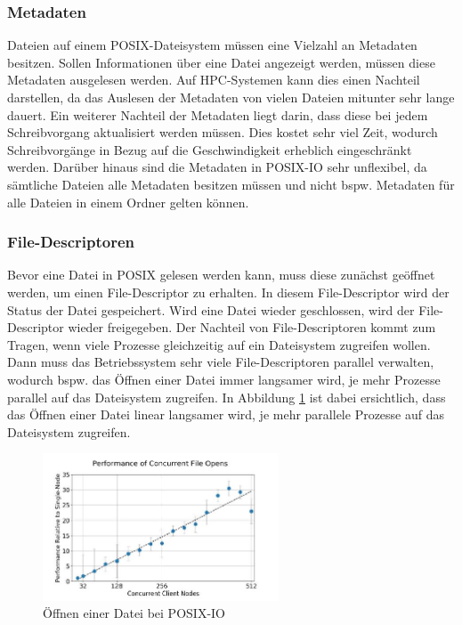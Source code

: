 \subsubsection{Metadaten}
Dateien auf einem POSIX-Dateisystem m\"ussen eine Vielzahl an Metadaten besitzen. Sollen Informationen \"uber eine Datei angezeigt werden, m\"ussen diese Metadaten ausgelesen werden. Auf HPC-Systemen kann dies einen Nachteil darstellen, da das Auslesen der Metadaten von vielen Dateien mitunter sehr lange dauert\cite{Layton.02.03.2010}.\newline
Ein weiterer Nachteil der Metadaten liegt darin, dass diese bei jedem Schreibvorgang aktualisiert werden m\"ussen. Dies kostet sehr viel Zeit, wodurch Schreibvorg\"ange in Bezug auf die Geschwindigkeit erheblich eingeschr\"ankt werden.\newline
Dar\"uber hinaus sind die Metadaten in POSIX-IO sehr unflexibel, da s\"amtliche Dateien alle Metadaten besitzen m\"ussen und nicht bspw. Metadaten f\"ur alle Dateien in einem Ordner gelten k\"onnen.
\subsubsection{File-Descriptoren}
Bevor eine Datei in POSIX gelesen werden kann, muss diese zun\"achst ge\"offnet werden, um einen File-Descriptor zu erhalten. In diesem File-Descriptor wird der Status der Datei gespeichert. Wird eine Datei wieder geschlossen, wird der File-Descriptor wieder freigegeben.\newline
Der Nachteil von File-Descriptoren kommt zum Tragen, wenn viele Prozesse gleichzeitig auf ein Dateisystem zugreifen wollen. Dann muss das Betriebssystem sehr viele File-Descriptoren parallel verwalten, wodurch bspw. das \"Offnen einer Datei immer langsamer wird, je mehr Prozesse parallel auf das Dateisystem zugreifen. In Abbildung \ref{fig:posix} ist dabei ersichtlich, dass das \"Offnen einer Datei linear langsamer wird, je mehr parallele Prozesse auf das Dateisystem zugreifen.
\begin{figure}[h]
	\centering
	\includegraphics[width=7cm]{fig/PosixIO.jpg}
	\caption{\"Offnen einer Datei bei POSIX-IO \cite{Lockwood.11.09.2017}}
	\label{fig:posix}
\end{figure}
